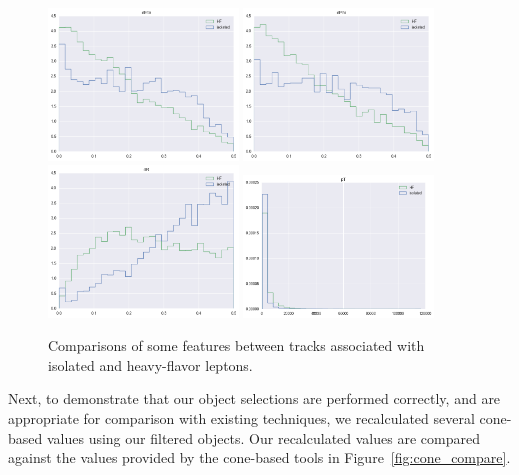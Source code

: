 \begin{figure}[htbp]
    \centering
    \includegraphics[width=0.45\textwidth]{Images/RNN/track_dEta.png}
    \includegraphics[width=0.45\textwidth]{Images/RNN/track_dPhi.png}
    \includegraphics[width=0.45\textwidth]{Images/RNN/track_dR.png}
    \includegraphics[width=0.45\textwidth]{Images/RNN/track_pT.png}
    \caption{Comparisons of some features between tracks associated with isolated and heavy-flavor leptons.}
    \label{fig:track_features}
\end{figure}

Next, to demonstrate that our object selections are performed correctly, and are appropriate for comparison with existing techniques, we recalculated several cone-based values using our filtered objects. Our recalculated values are compared against the values provided by the cone-based tools in Figure~\ref{fig:cone_compare}.

